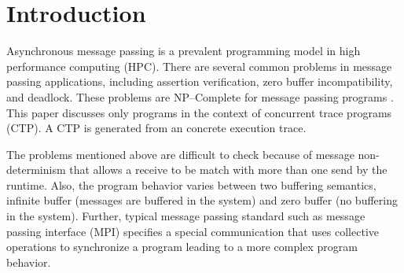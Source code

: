 \section{Introduction}
Asynchronous message passing is a prevalent programming model in high performance computing (HPC). There are several common problems in message passing applications, including assertion verification, zero buffer incompatibility, and deadlock. These problems are NP--Complete for message passing programs \cite{DBLP:conf/kbse/HuangMM13,HuangNFM15,HuangDeadlock}. This paper discusses only programs in the context of concurrent trace programs (CTP). A CTP is generated from an concrete execution trace.

The problems mentioned above are difficult to check because of message non-determinism that allows a receive to be match with more than one send by the runtime. Also, the program behavior varies between two buffering semantics, infinite buffer (messages are buffered in the system) and zero buffer (no buffering in the system). Further, typical message passing standard such as message passing interface (MPI) specifies a special communication that uses collective operations to synchronize a program leading to a more complex program behavior. 


